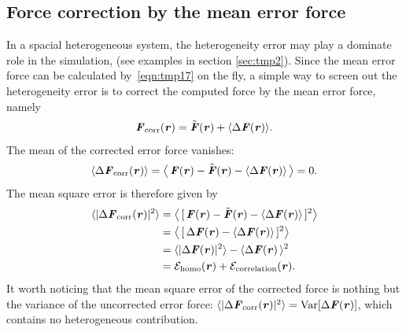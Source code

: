 \documentclass[aps,pre,preprint]{revtex4}
\renewcommand{\v}[1]{\textbf{\textit{#1}}}
\renewcommand{\d}[1]{\textsf{#1}}
\begin{document}

\subsection{Force correction by the mean error force}

In a spacial heterogeneous system, the heterogeneity error may play a
dominate role in the simulation, (see examples in section
\ref{sec:tmp2}).  Since the mean error force can be calculated
by~\eqref{eqn:tmp17} on the fly, a simple way to screen out the
heterogeneity error is to correct the computed force by the mean error
force, namely
\begin{align}\label{eqn:define-fcorr}
  \v F_{\textrm{corr}}(\v r) = \tilde{\v F}(\v r) + \langle\Delta\v F(\v r)\rangle.
\end{align}
The mean of the corrected error force vanishes:
\begin{align}\label{eqn:mean-fcorr}
  \langle\Delta\v F_{\textrm{corr}}(\v r)\rangle
   =
  \big\langle\,
  \v F(\v r) - \tilde{\v F}(\v r) - \langle\Delta\v F(\v r)\rangle\,
  \big\rangle = 0.
\end{align}
The mean square error is therefore given by
\begin{align} \nonumber
  \langle\vert\Delta\v F_{\textrm{corr}}(\v r)\vert^2\rangle
  & =
  \big\langle\,
  [\,\v F(\v r) - \tilde{\v F}(\v r) - \langle\Delta\v F(\v r)\rangle\,]^2
  \big\rangle \\\nonumber
  & =
  \big\langle\,
  [\,\Delta\v F(\v r) - \langle\Delta\v F(\v r)\rangle\,]^2
  \big\rangle \\\nonumber
  & =
  \langle\vert\Delta\v F(\v r)\vert^2\rangle -
  \langle\Delta\v F(\v r)\,\rangle^2 \\
  & =
  \mathcal E_{\textrm{homo}}(\v r) +
  \mathcal E_{\textrm{correlation}}(\v r).
\end{align}
It worth noticing that the mean square error of the corrected force is
nothing but the variance of the uncorrected  error force:
$\langle\vert\Delta\v F_{\textrm{corr}}(\v r)\vert^2\rangle =
\textrm{Var}[\Delta\v F(\v r)]$, which contains no heterogeneous
contribution.
\end{document}

